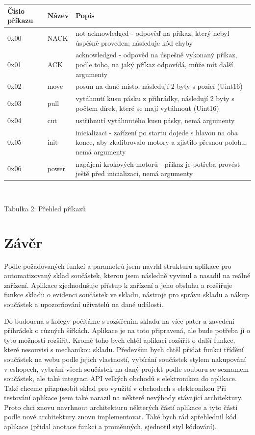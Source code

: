 \documentclass[12pt, a4paper, oneside]{article}
\begin{document}
\begin{center}
\begin{tabular}{| l | l | p{10 cm} |}
\hline
Číslo příkazu & Název & Popis \\ \hline
0x00 & NACK & not acknowledged - odpověď na příkaz, který nebyl úspěšně proveden; následuje kód chyby \\ \hline
0x01 & ACK & acknowledged - odpověd na úspešně vykonaný příkaz, podle toho, na jaký příkaz odpovídá, může mít další argumenty \\ \hline
0x02 & move & posun na dané místo, následují 2 byty s pozicí (Uint16) \\ \hline
0x03 & pull & vytáhnutí kusu pásku z přihrádky, následují 2 byty s počtem dírek, které se mají vytáhnout (Uint16) \\ \hline
0x04 & cut & ustřihnutí vytáhnutého kusu pásky, nemá argumenty \\ \hline
0x05 & init & inicializaci - zařízení po startu dojede s hlavou na oba konce, aby zkalibrovalo motory a zjistilo přesnou polohu, nemá argumenty \\ \hline
0x06 & power & napájení krokových motorů - příkaz je potřeba provést ještě před inicializací, nemá argumenty \\ \hline
\end{tabular}
\\
\vspace{1mm}
\caption{Tabulka 2: Přehled příkazů}
\end{center}
\vspace{6mm}


\newpage

\section*{Závěr} %

Podle požadovaných funkcí a parametrů jsem navrhl strukturu aplikace pro automatizovaný sklad součástek, kterou  jsem následně vyvinul a nasadil na reálné zařízení. 
Aplikace zjednodušuje přístup k zařízení a jeho obsluhu a rozšiřuje funkce skladu o evidenci součástek ve skladu, nástroje pro správu skladu a nákup součástek a upozorňování uživatelů na dané události.

Do budoucna s kolegy počítáme s rozšířením skladu na více pater a zavedení přihrádek o různých šířkách. Aplikace je na toto připravená, ale bude potřeba ji o tyto možnosti rozšířit.
Kromě toho bych chtěl aplikaci rozšířit o další funkce, které nesouvisí s mechanikou skladu. Především bych chtěl přidat funkci třídění součástek na webu podle jejich vlastností, vybírání součástek stylem nakupování v eshopech, vybrání všech součástek na daný projekt podle souboru se seznamem součástek, ale také integraci API velkých obchodů s elektronikou do aplikace. Také chceme přizpůsobit sklad pro využití v obchodech s elektronikou
Při testování aplikace jsem také narazil na některé nevýhody stávající architektury. Proto chci znovu navrhnout architekturu některých částí aplikace a tyto části podle nové architektury znovu implementovat. Také bych rád zpřehlednil kód aplikace (přidal anotace funkcí a proměnných, sjednotil styl kódování).
\end{document}
